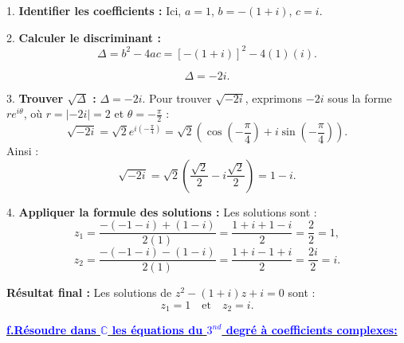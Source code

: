 \documentclass[12pt]{article}
\begin{document}
1. \textbf{Identifier les coefficients :}  
   Ici, \( a = 1 \), \( b = -(1 + i) \), \( c = i \).

2. \textbf{Calculer le discriminant :}  
   \[
   \Delta = b^2 - 4ac = [-(1 + i)]^2 - 4(1)(i).
   \]

   \[
   \Delta =-2i.
   \]

3. \textbf{Trouver \( \sqrt{\Delta} \) :}  
   \( \Delta = -2i \). Pour trouver \( \sqrt{-2i} \), exprimons \( -2i \) sous la forme \( r e^{i\theta} \), où \( r = |-2i| = 2 \) et \( \theta = -\frac{\pi}{2} \) :  
   \[
   \sqrt{-2i} = \sqrt{2} e^{i(-\frac{\pi}{4})} = \sqrt{2} \left( \cos(-\frac{\pi}{4}) + i\sin(-\frac{\pi}{4}) \right).
   \]
   Ainsi :
   \[
   \sqrt{-2i} = \sqrt{2} \left( \frac{\sqrt{2}}{2} - i\frac{\sqrt{2}}{2} \right) = 1 - i.
   \]

4. \textbf{Appliquer la formule des solutions :}  
   Les solutions sont :
   \[
   z_1 = \frac{-(-1 - i) + (1 - i)}{2(1)} = \frac{1 + i + 1 - i}{2} = \frac{2}{2} = 1,
   \]
   \[
   z_2 = \frac{-(-1 - i) - (1 - i)}{2(1)} = \frac{1 + i - 1 + i}{2} = \frac{2i}{2} = i.
   \]

\textbf{Résultat final :}  
Les solutions de \( z^2 - (1 + i)z + i = 0 \) sont :
\[
z_1 = 1 \quad \text{et} \quad z_2 = i.
\]

\underline{\textbf{\textcolor{blue}{f.Résoudre dans $\mathbb{C}$ les équations du $3^{nd}$ degré à coefficients complexes:}}}\\
\end{document}
